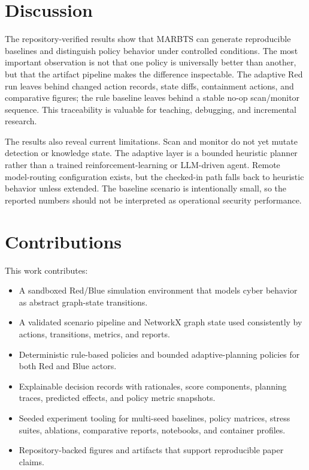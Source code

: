 \documentclass[conference]{IEEEtran}
\begin{document}
\section{Discussion}
The repository-verified results show that MARBTS can generate reproducible baselines and distinguish policy behavior under controlled conditions. The most important observation is not that one policy is universally better than another, but that the artifact pipeline makes the difference inspectable. The adaptive Red run leaves behind changed action records, state diffs, containment actions, and comparative figures; the rule baseline leaves behind a stable no-op scan/monitor sequence. This traceability is valuable for teaching, debugging, and incremental research.

The results also reveal current limitations. Scan and monitor do not yet mutate detection or knowledge state. The adaptive layer is a bounded heuristic planner rather than a trained reinforcement-learning or LLM-driven agent. Remote model-routing configuration exists, but the checked-in path falls back to heuristic behavior unless extended. The baseline scenario is intentionally small, so the reported numbers should not be interpreted as operational security performance.

\section{Contributions}
This work contributes:

\begin{itemize}
    \item A sandboxed Red/Blue simulation environment that models cyber behavior as abstract graph-state transitions.
    \item A validated scenario pipeline and NetworkX graph state used consistently by actions, transitions, metrics, and reports.
    \item Deterministic rule-based policies and bounded adaptive-planning policies for both Red and Blue actors.
    \item Explainable decision records with rationales, score components, planning traces, predicted effects, and policy metric snapshots.
    \item Seeded experiment tooling for multi-seed baselines, policy matrices, stress suites, ablations, comparative reports, notebooks, and container profiles.
    \item Repository-backed figures and artifacts that support reproducible paper claims.
\end{itemize}
\end{document}
